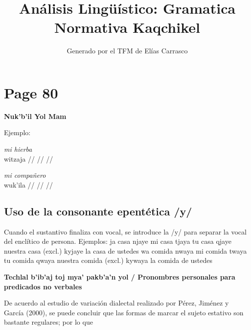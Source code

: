 \documentclass{article}%
\title{Análisis Lingüístico: Gramatica Normativa Kaqchikel}%
\author{Generado por el TFM de Elías Carrasco}%
\begin{document}
%
\normalsize%
\maketitle%
\section{Page 80}%
\label{sec:Page80}%
\centerline{\textbf{Nuk’b’il Yol Mam}}%
Ejemplo: %
\par\medskip%
\ex
\textit{mi hierba} \\
\begingl
\gla witzaja //
\glb  //
\glc  //
\endgl
\xe
%
\medskip%
\par\medskip%
\ex
\textit{mi compañero} \\
\begingl
\gla wuk’ila //
\glb  //
\glc  //
\endgl
\xe
%
\medskip%
\subsection{Uso de la consonante epentética /y/}%
\label{subsec:Usodelaconsonanteepenttica/y/}%

%
Cuando el sustantivo finaliza con vocal, se introduce la /y/ para separar la vocal del enclítico de persona. %
Ejemplos: %
ja casa %
njaye mi casa %
tjaya tu casa %
qjaye nuestra casa (excl.) %
kyjaye la casa de ustedes %
wa comida %
nwaya mi comida %
twaya tu comida %
qwaya nuestra comida (excl.) %
kywaya la comida de ustedes %
\centerline{\textbf{Techlal b’ib’aj toj mya’ pakb’a’n yol / Pronombres personales para predicados no verbales}}%
De acuerdo al estudio de variación dialectal realizado por Pérez, Jiménez y García (2000), se puede concluir que las formas de marcar el sujeto estativo son bastante regulares; por lo que 

%
\end{document}
